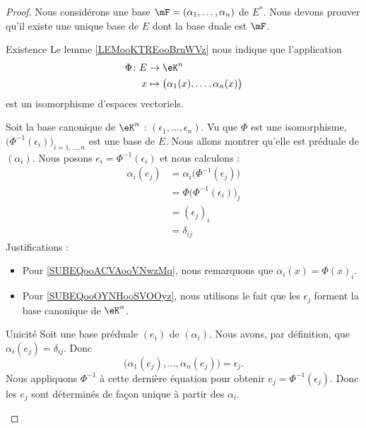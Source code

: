 \begin{proof}
    Nous considérons une base \( \mF=(\alpha_1,\ldots, \alpha_n)\) de \( E^*\). Nous devons prouver qu'il existe une unique base de \( E\) dont la base duale est \( \mF\).

    \begin{subproof}
    \item[Existence]
        Le lemme \ref{LEMooKTREooBrnWVz} nous indique que l'application
        \begin{equation}
            \begin{aligned}
                \Phi\colon E&\to \eK^n \\
                x&\mapsto \big( \alpha_1(x),\ldots, \alpha_n(x) \big) 
            \end{aligned}
        \end{equation}
        est un isomorphisme d'espaces vectoriels.

        Soit la base canonique de \( \eK^n\) : \( (\epsilon_1,\ldots, \epsilon_n)\). Vu que \( \Phi\) est une isomorphisme, \( \big( \Phi^{-1}(\epsilon_i) \big)_{i=1,\ldots, n}\) est une base de \( E\). Nous allons montrer qu'elle est préduale de \( (\alpha_i)\). Nous posons \( e_i=\Phi^{-1}(\epsilon_i)\) et nous calculons :
        \begin{subequations}
            \begin{align}
                \alpha_i(e_j)&=\alpha_i\big( \Phi^{-1}(\epsilon_j) \big)\\
                &=\Phi\big( \Phi^{-1}(\epsilon_i) \big)_j  \label{SUBEQooACVAooVNwzMq}\\
                &=(\epsilon_j)_i\\
                &=\delta_{ij} \label{SUBEQooOYNHooSVOOyz}
            \end{align}
        \end{subequations}
        Justifications :
        \begin{itemize}
            \item Pour \ref{SUBEQooACVAooVNwzMq}, nous remarquons que \( \alpha_i(x)=\Phi(x)_i\).
            \item Pour \ref{SUBEQooOYNHooSVOOyz}, nous utilisons le fait que les \( \epsilon_j\) forment la base canonique de \( \eK^n\).
        \end{itemize}
    
    \item[Unicité]
        Soit une base préduale \( (e_i)\) de \( (\alpha_i)\). Nous avons, par définition, que \( \alpha_i(e_j)=\delta_{ij}\). Donc
        \begin{equation}
            \big( \alpha_1(e_j),\ldots, \alpha_n(e_j) \big)=\epsilon_j.
        \end{equation}
        Nous appliquons \( \Phi^{-1}\) à cette dernière équation pour obtenir \( e_j=\Phi^{-1}(\epsilon_j)\). Donc les \( e_j\) sont déterminés de façon unique à partir des \( \alpha_i\).
    \end{subproof}
\end{proof}



